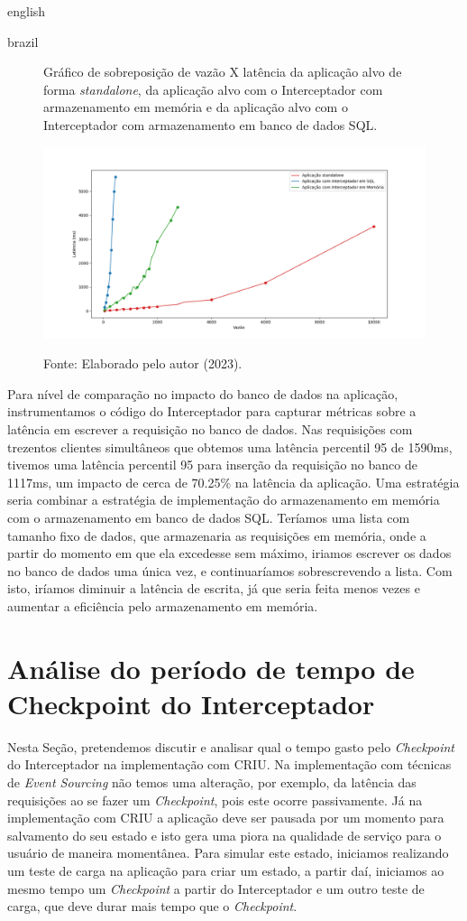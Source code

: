 \begin{otherlanguage*}{english}
\begin{otherlanguage*}{brazil}
\begin{figure}[h]
\centering
\caption{Gráfico de sobreposição de vazão X latência da aplicação alvo de forma \textit{standalone}, da aplicação alvo com o Interceptador com armazenamento em memória e da aplicação alvo com o Interceptador com armazenamento em banco de dados SQL.}
\includegraphics[scale=0.46]{images/vazaoxlatencia.png}
\label{fig:analysis-interceptor-standalone}
\caption*{Fonte: Elaborado pelo autor (2023).}
\end{figure}

Para nível de comparação no impacto do banco de dados na aplicação, instrumentamos o
código do Interceptador para capturar métricas sobre a latência em escrever a requisição
no banco de dados. Nas requisições com trezentos clientes simultâneos que obtemos uma
latência percentil 95 de 1590ms, tivemos uma latência percentil 95 para inserção da requisição no banco
de 1117ms, um impacto de cerca de 70.25\% na latência da aplicação. Uma estratégia seria combinar
a estratégia de implementação do armazenamento em memória com o armazenamento em banco de
dados SQL. Teríamos uma lista com tamanho fixo de dados, que armazenaria as requisições em
memória, onde a partir do momento em que ela excedesse sem máximo, iriamos escrever os dados no
banco de dados uma única vez, e continuaríamos sobrescrevendo a lista. Com isto,
iríamos diminuir a latência de escrita, já que seria feita menos vezes e aumentar a
eficiência pelo armazenamento em memória.

\section{Análise do período de tempo de Checkpoint do Interceptador}

Nesta Seção, pretendemos discutir e analisar qual o tempo gasto pelo \textit{Checkpoint} do
Interceptador na implementação com CRIU. Na implementação com técnicas de
\textit{Event Sourcing} não temos uma alteração, por exemplo, da latência das requisições ao
se fazer um \textit{Checkpoint}, pois este ocorre passivamente. Já na implementação com CRIU
a aplicação deve ser pausada por um momento para salvamento do seu estado e isto gera uma
piora na qualidade de serviço para o usuário de maneira momentânea. Para simular este estado,
iniciamos realizando um teste de carga na aplicação para criar um estado, a partir daí, iniciamos
ao mesmo tempo um \textit{Checkpoint} a partir do Interceptador e um outro teste de carga, que deve
durar mais tempo que o \textit{Checkpoint}.


\end{otherlanguage*}
\end{otherlanguage*}
